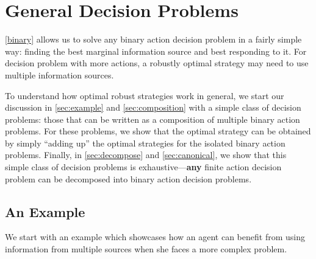 \documentclass[11pt]{article}
\theoremstyle{plain}
\theoremstyle{remark}
\begin{document}
\section{General Decision Problems}\label{sec:binarygen}

\autoref{binary} allows us to solve any binary action decision problem in a fairly simple way: finding the best marginal information source and best responding to it. For decision problem with more actions, a robustly optimal strategy may need to use multiple information sources. 

To understand how optimal robust strategies work in general, we start our discussion in \autoref{sec:example} and \autoref{sec:composition} with a simple class of decision problems: those that can be written as a composition of multiple binary action problems. For these problems, we show that the optimal strategy can be obtained by simply ``adding up'' the optimal strategies for the isolated binary action problems. Finally, in \autoref{sec:decompose} and \autoref{sec:canonical}, we show that this simple class of decision problems is exhaustive---\textbf{any} finite action decision problem can be decomposed into binary action decision problems.




\subsection{An Example}\label{sec:example}

We start with an example which showcases how an agent can benefit from using information from multiple sources when she faces a more complex problem.
\end{document}
